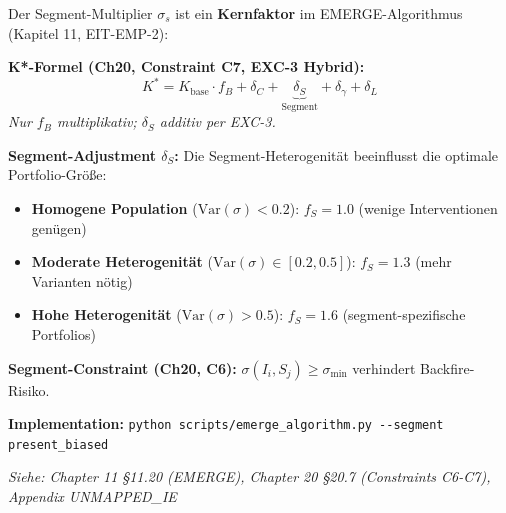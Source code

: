 \begin{tcolorbox}[colback=blue!5!white, colframe=blue!75!black,
    title=\textbf{Cross-Reference: EMERGE Algorithm \& Segment-K* (Chapter 11, 20)}]

Der Segment-Multiplier $\sigma_s$ ist ein \textbf{Kernfaktor} im EMERGE-Algorithmus (Kapitel 11, EIT-EMP-2):

\vspace{0.2cm}
\textbf{K*-Formel (Ch20, Constraint C7, EXC-3 Hybrid):}
\begin{equation*}
K^* = K_{\text{base}} \cdot f_B + \delta_C + \underbrace{\delta_S}_{\text{Segment}} + \delta_\gamma + \delta_L
\end{equation*}
\textit{Nur $f_B$ multiplikativ; $\delta_S$ additiv per EXC-3.}

\textbf{Segment-Adjustment $\delta_S$:} Die Segment-Heterogenität beeinflusst die optimale Portfolio-Größe:
\begin{itemize}[nosep]
\item \textbf{Homogene Population} ($\text{Var}(\sigma) < 0.2$): $f_S = 1.0$ (wenige Interventionen genügen)
\item \textbf{Moderate Heterogenität} ($\text{Var}(\sigma) \in [0.2, 0.5]$): $f_S = 1.3$ (mehr Varianten nötig)
\item \textbf{Hohe Heterogenität} ($\text{Var}(\sigma) > 0.5$): $f_S = 1.6$ (segment-spezifische Portfolios)
\end{itemize}

\vspace{0.2cm}
\textbf{Segment-Constraint (Ch20, C6):} $\sigma(I_i, S_j) \geq \sigma_{\min}$ verhindert Backfire-Risiko.

\vspace{0.2cm}
\textbf{Implementation:} \texttt{python scripts/emerge\_algorithm.py -{}-segment present\_biased}

\vspace{0.2cm}
\textit{Siehe: Chapter 11 §11.20 (EMERGE), Chapter 20 §20.7 (Constraints C6-C7), Appendix UNMAPPED_IE}
\end{tcolorbox}


